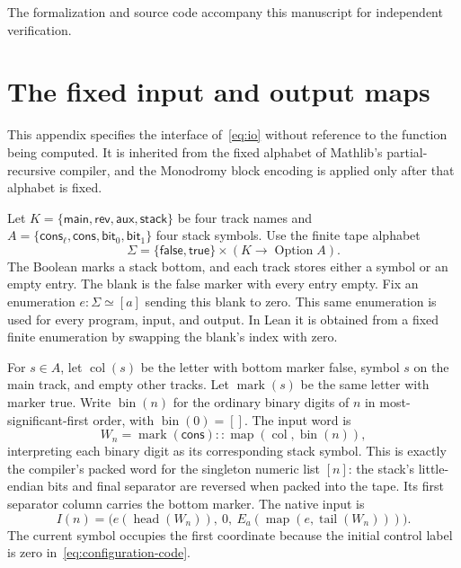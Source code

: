 \documentclass[11pt]{article}
\numberwithin{equation}{section}
\theoremstyle{definition}
\theoremstyle{remark}
\newcommand{\bin}{\operatorname{bin}}
\begin{document}
The formalization and source code accompany this manuscript for
independent verification.

\clearpage
\appendix

\section{The fixed input and output maps}\label{app:io}

This appendix specifies the interface of~\eqref{eq:io} without
reference to the function being computed. It is inherited from the
fixed alphabet of Mathlib's partial-recursive compiler, and the
Monodromy block encoding is applied only after that alphabet is fixed.

Let $K=\{\mathsf{main},\mathsf{rev},\mathsf{aux},\mathsf{stack}\}$
be four track names and
$A=\{\mathsf{cons}_\ell,\mathsf{cons},\mathsf{bit}_0,
\mathsf{bit}_1\}$ four stack symbols. Use the finite tape alphabet
\[
 \Sigma=\{\mathsf{false},\mathsf{true}\}
       \times (K\to\operatorname{Option}A).
\]
The Boolean marks a stack bottom, and each track stores either a
symbol or an empty entry. The blank is the false marker with every
entry empty. Fix an enumeration $e:\Sigma\simeq[a]$ sending this
blank to zero. This same enumeration is used for every program,
input, and output. In Lean it is obtained from a fixed finite
enumeration by swapping the blank's index with zero.

For $s\in A$, let $\operatorname{col}(s)$ be the letter with bottom
marker false, symbol $s$ on the main track, and empty other tracks.
Let $\operatorname{mark}(s)$ be the same letter with marker true.
Write $\bin(n)$ for the ordinary binary digits of $n$ in
most-significant-first order, with $\bin(0)=[]$. The input word is
\begin{equation}\label{eq:numeric-word}
 W_n=\operatorname{mark}(\mathsf{cons})::
       \operatorname{map}(\operatorname{col},\bin(n)),
\end{equation}
interpreting each binary digit as its corresponding stack symbol.
This is exactly the compiler's packed word for the singleton numeric
list $[n]$: the stack's little-endian bits and final separator are
reversed when packed into the tape. Its first separator column carries
the bottom marker. The native input is
\begin{equation}\label{eq:input-exact}
 I(n)=\bigl(e(\operatorname{head}(W_n)),\ 0,\
              E_a(\operatorname{map}(e,\operatorname{tail}(W_n)))\bigr).
\end{equation}
The current symbol occupies the first coordinate because the initial
control label is zero in~\eqref{eq:configuration-code}.
\end{document}
